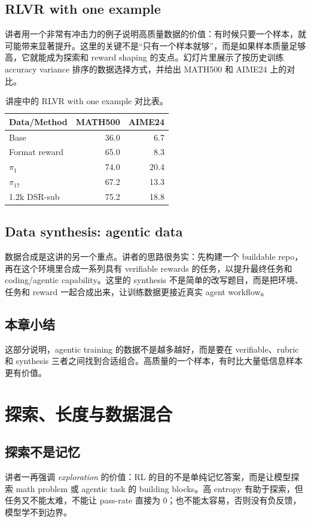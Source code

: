 \documentclass[a4paper]{article}
\begin{document}
\subsection{RLVR with one example}
讲者用一个非常有冲击力的例子说明高质量数据的价值：有时候只要一个样本，就可能带来显著提升。这里的关键不是“只有一个样本就够”，而是如果样本质量足够高，它就能成为探索和 reward shaping 的支点。幻灯片里展示了按历史训练 accuracy variance 排序的数据选择方式，并给出 MATH500 和 AIME24 上的对比。

\begin{table}[H]
\centering
\small
\begin{tabular}{@{}lrr@{}}
\toprule
Data/Method & MATH500 & AIME24 \\
\midrule
Base & 36.0 & 6.7 \\
Format reward & 65.0 & 8.3 \\
$\pi_1$ & 74.0 & 20.4 \\
$\pi_{17}$ & 67.2 & 13.3 \\
1.2k DSR-sub & 75.2 & 18.8 \\
\bottomrule
\end{tabular}
\caption{讲座中的 RLVR with one example 对比表。}
\end{table}

\subsection{Data synthesis: agentic data}
数据合成是这讲的另一个重点。讲者的思路很务实：先构建一个 buildable repo，再在这个环境里合成一系列具有 verifiable rewards 的任务，以提升最终任务和 coding/agentic capability。这里的 synthesis 不是简单的改写题目，而是把环境、任务和 reward 一起合成出来，让训练数据更接近真实 agent workflow。

\subsection{本章小结}
这部分说明，agentic training 的数据不是越多越好，而是要在 verifiable、rubric 和 synthesis 三者之间找到合适组合。高质量的一个样本，有时比大量低信息样本更有价值。

\section{探索、长度与数据混合}
\subsection{探索不是记忆}
讲者一再强调 \emph{exploration} 的价值：RL 的目的不是单纯记忆答案，而是让模型探索 math problem 或 agentic task 的 building blocks。高 entropy 有助于探索，但任务又不能太难，不能让 pass-rate 直接为 0；也不能太容易，否则没有负反馈，模型学不到边界。
\end{document}
